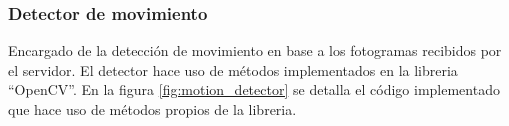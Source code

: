 
\subsubsection{Detector de movimiento}
Encargado de la detección de movimiento en base a los fotogramas recibidos por el servidor. El detector hace uso de métodos  implementados en la libreria ``OpenCV''. En la figura \ref{fig:motion_detector} se detalla el código implementado que hace uso de métodos propios de la libreria.

